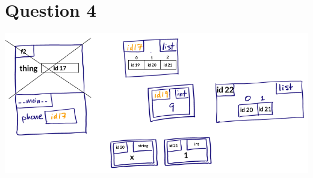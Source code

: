 \documentclass[12pt]{article}
\begin{document}
\bigskip


\section*{Question 4}
\begin{center}
\includegraphics[width=0.8\linewidth]{images/worksheet_1_review_q4_solution.png}
\end{center}
\end{document}
